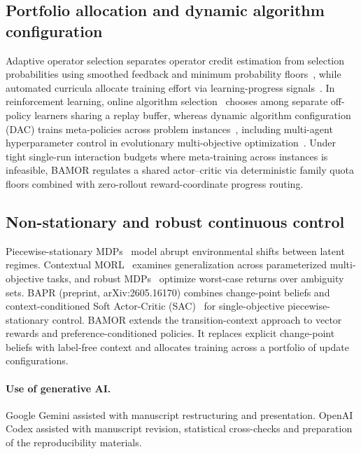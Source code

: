 \documentclass[10pt]{article}
\let\cite\citep
\begin{document}
\subsection{Portfolio allocation and dynamic algorithm configuration}
Adaptive operator selection separates operator credit estimation from selection
probabilities using smoothed feedback and minimum probability floors~\cite{DaCosta2008AOS},
while automated curricula allocate training effort via learning-progress
signals~\cite{Graves2017Curriculum}. In reinforcement learning, online algorithm
selection~\cite{Laroche2018Selection} chooses among separate off-policy learners
sharing a replay buffer, whereas dynamic algorithm configuration (DAC) trains
meta-policies across problem instances~\cite{Biedenkapp2020DAC}, including
multi-agent hyperparameter control in evolutionary multi-objective
optimization~\cite{Xue2022MADAC}. Under tight single-run interaction budgets
where meta-training across instances is infeasible, BAMOR regulates a shared
actor--critic via deterministic family quota floors combined with zero-rollout
reward-coordinate progress routing.

\subsection{Non-stationary and robust continuous control}
Piecewise-stationary MDPs~\cite{Padakandla2020Survey,Lecarpentier2019NonStationary}
model abrupt environmental shifts between latent regimes. Contextual
MORL~\cite{Teoh2025MOCMDP} examines generalization across parameterized
multi-objective tasks, and robust MDPs~\cite{Wiesemann2013RobustMDP} optimize
worst-case returns over ambiguity sets. BAPR (preprint, arXiv:2605.16170)
combines change-point beliefs and context-conditioned Soft Actor-Critic
(SAC)~\cite{Haarnoja2018SAC} for single-objective piecewise-stationary
control. BAMOR extends the transition-context approach to vector rewards
and preference-conditioned policies. It replaces explicit change-point
beliefs with label-free context and allocates training across a portfolio
of update configurations.




\paragraph{Use of generative AI.}
Google Gemini assisted with manuscript restructuring and presentation.
OpenAI Codex assisted with manuscript revision, statistical cross-checks and
preparation of the reproducibility materials.
\end{document}
